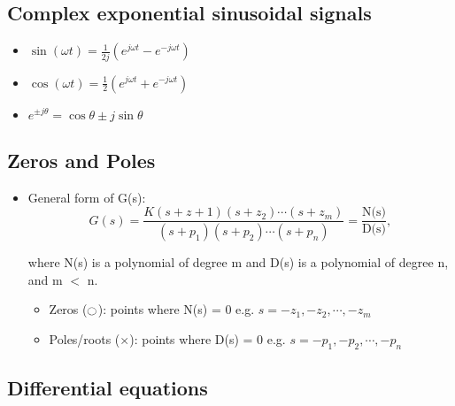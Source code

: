 \documentclass[a4paper]{article}
\begin{document}
\subsection{Complex exponential sinusoidal signals}
\begin{itemize}
    \item $\sin(\omega t) = \displaystyle\frac{1}{2j}\left(e^{j\omega t}-e^{-j\omega t}\right)$
    \item $\cos(\omega t) = \displaystyle\frac{1}{2}\left(e^{j\omega t}+e^{-j\omega t}\right)$
    \item $e^{\pm j\theta} = \cos\theta \pm j \sin\theta$
\end{itemize}
\subsection{Zeros and Poles}
\begin{itemize}
    \item General form of G(s): $$G(s) = \frac{K(s+z+1)(s+z_2)\cdots(s+z_m)}{(s+p_1)(s+p_2)\cdots(s+p_n)}=\frac{\text{N(s)}}{\text{D(s)}},$$
    \begin{center}
       where N(s) is a polynomial of degree m and D(s) is a polynomial of degree n, and m $<$ n.
    \end{center}
    \begin{itemize}[label=$\circ$]
        \item Zeros ($\ocircle$): points where N(s) = 0
        \quad e.g. $s=-z_1, -z_2,\cdots,-z_m$
        \item Poles/roots ($\times$): points where D(s) = 0 \quad e.g. $s=-p_1, -p_2, \cdots, -p_n$
    \end{itemize}
\end{itemize}
\subsection{Differential equations}
\begin{center}
\end{center}
\end{document}
